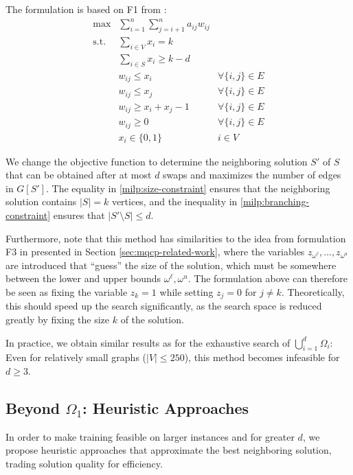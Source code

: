 \documentclass[draft,final]{vutinfth} %
\begin{document}
The formulation is based on F1 from \cite{pattillo_maximum_2013}:  
\begin{align}
    \max & \sum_{i=1}^n \sum_{j=i+1}^n a_{ij} w_{ij}  &\\
    \text{s.t. } & \sum_{i \in V} x_i = k & \label{milp:size-constraint} \\
    & \sum_{i \in S} x_i \geq k - d  &  \label{milp:branching-constraint}\\
     & w_{ij} \leq x_i & \forall \{i, j\} \in E\\
     & w_{ij} \leq x_j & \forall \{i, j\} \in E\\
     & w_{ij} \geq x_i + x_j - 1 & \forall \{i, j\} \in E\\
    & w_{ij} \geq 0 & \forall \{i, j\} \in E \\
    & x_i \in \{0,1\} & i \in V
\end{align}

We change the objective function to determine the neighboring solution $S'$ of $S$ that can be obtained after at most $d$ swaps and maximizes the number of edges in $G[S']$. The equality in \ref{milp:size-constraint} ensures that the neighboring solution contains $|S| = k$ vertices, and the inequality in \ref{milp:branching-constraint} ensures that $|S' \setminus S| \leq d$. 

Furthermore, note that this method has similarities to the idea from formulation F3 in \cite{VeremyevPBP16} presented in Section \ref{sec:mqcp-related-work}, where the variables $z_{\omega^\ell}, \dots, z_{\omega^u}$ are introduced that ``guess'' the size of the solution, which must be somewhere between the lower and upper bounds $\omega^\ell, \omega^u$. The formulation above can therefore be seen as fixing the variable $z_k = 1$ while setting $z_j = 0$ for $j \neq k$. Theoretically, this should speed up the search significantly, as the search space is reduced greatly by fixing the size $k$ of the solution.  

In practice, we obtain similar results as for the exhaustive search of $\bigcup_{i=1}^d \Omega_i$: Even for relatively small graphs ($|V| \leq 250$), this method becomes infeasible for $d \geq 3$. 

\subsection{Beyond $\Omega_1$: Heuristic Approaches}

In order to make training feasible on larger instances and for greater $d$, we propose heuristic approaches that approximate the best neighboring solution, trading solution quality for efficiency. 
\end{document}
